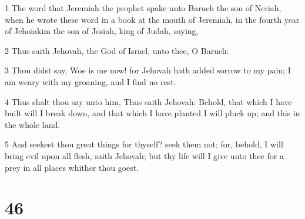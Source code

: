 \par 1 The word that Jeremiah the prophet spake unto Baruch the son of Neriah, when he wrote these word in a book at the mouth of Jeremiah, in the fourth year of Jehoiakim the son of Josiah, king of Judah, saying,
\par 2 Thus saith Jehovah, the God of Israel, unto thee, O Baruch:
\par 3 Thou didst say, Woe is me now! for Jehovah hath added sorrow to my pain; I am weary with my groaning, and I find no rest.
\par 4 Thus shalt thou say unto him, Thus saith Jehovah: Behold, that which I have built will I break down, and that which I have planted I will pluck up; and this in the whole land.
\par 5 And seekest thou great things for thyself? seek them not; for, behold, I will bring evil upon all flesh, saith Jehovah; but thy life will I give unto thee for a prey in all places whither thou goest.

\chapter{46}

